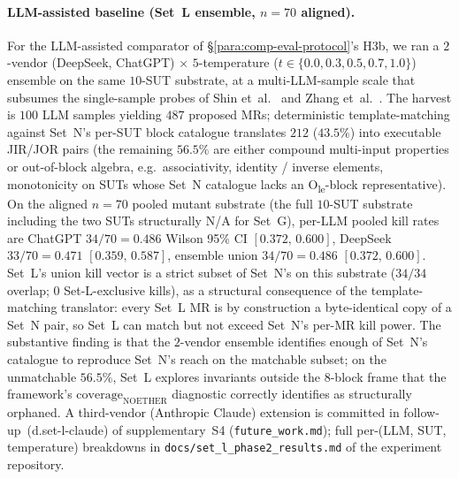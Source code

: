\documentclass[acmsmall, screen]{acmart}
\begin{document}
\paragraph{LLM-assisted baseline (Set~L ensemble, $n = 70$ aligned).}
\label{para:set-l-ensemble}
For the LLM-assisted comparator of \S\ref{para:comp-eval-protocol}'s
H3b, we ran a $2$-vendor (DeepSeek, ChatGPT) $\times$ $5$-temperature
($t \in \{0.0, 0.3, 0.5, 0.7, 1.0\}$) ensemble on the same
$10$-SUT substrate, at a multi-LLM-sample scale that subsumes the
single-sample probes of Shin et~al.~\cite{Shin2024} and
Zhang et~al.~\cite{ZhangChatGPTMR2023}. The harvest is $100$ LLM samples
yielding $487$ proposed MRs; deterministic template-matching against
Set~N's per-SUT block catalogue translates $212$ ($43.5\%$) into
executable JIR/JOR pairs (the remaining $56.5\%$ are either compound
multi-input properties or out-of-block algebra, e.g.\ associativity,
identity / inverse elements, monotonicity on SUTs whose Set~N
catalogue lacks an O\textsubscript{le}-block representative). On the
aligned $n = 70$ pooled mutant substrate (the full $10$-SUT
substrate including the two SUTs structurally N/A for Set~G), per-LLM
pooled kill rates are ChatGPT $34/70 = 0.486$ Wilson 95\% CI
$[0.372,\,0.600]$, DeepSeek $33/70 = 0.471$ $[0.359,\,0.587]$,
ensemble union $34/70 = 0.486$ $[0.372,\,0.600]$. Set~L's union kill
vector is a strict subset of Set~N's on this substrate ($34/34$
overlap; $0$ Set-L-exclusive kills), as a structural consequence of
the template-matching translator: every Set~L MR is by construction
a byte-identical copy of a Set~N pair, so Set~L can match but not
exceed Set~N's per-MR kill power. The substantive finding is that
the $2$-vendor ensemble identifies enough of Set~N's catalogue to
reproduce Set~N's reach on the matchable subset; on the unmatchable
$56.5\%$, Set~L explores invariants outside the $8$-block frame that
the framework's $\mathrm{coverage}_{\mathrm{NOETHER}}$ diagnostic
correctly identifies as structurally orphaned. A third-vendor
(Anthropic Claude) extension is committed in
follow-up~(d.set-l-claude) of supplementary~S4 (\texttt{future\_work.md}); full
per-(LLM, SUT, temperature) breakdowns in
\texttt{docs/set\_l\_phase2\_results.md} of the experiment
repository.
\end{document}
